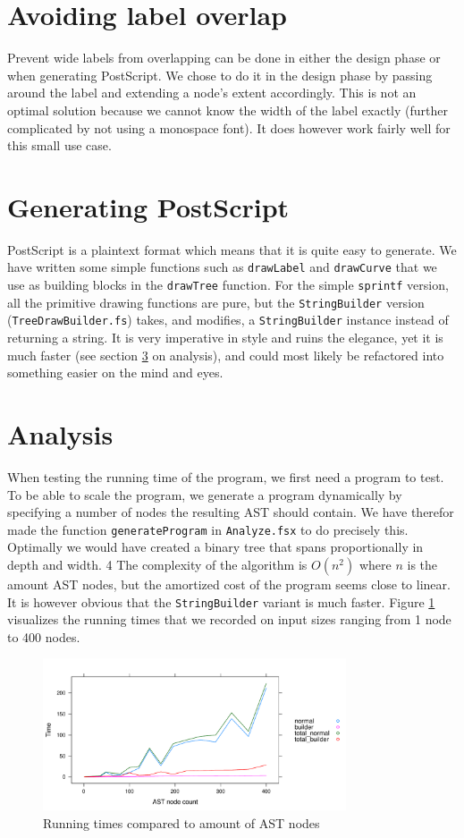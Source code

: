 \documentclass{article}
\begin{document}
\section{Avoiding label overlap}
Prevent wide labels from overlapping can be done in either the design phase or when generating PostScript. We chose to do it in the design phase by passing around the label and extending a node's extent accordingly. This is not an optimal solution because we cannot know the width of the label exactly (further complicated by not using a monospace font). It does however work fairly well for this small use case.


\section{Generating PostScript}
PostScript is a plaintext format which means that it is quite easy to generate. We have written some simple functions such as \texttt{drawLabel} and \texttt{drawCurve} that we use as building blocks in the \texttt{drawTree} function. For the simple \texttt{sprintf} version, all the primitive drawing functions are pure, but the \texttt{StringBuilder} version (\texttt{TreeDrawBuilder.fs}) takes, and modifies, a \texttt{StringBuilder} instance instead of returning a string. It is very imperative in style and ruins the elegance, yet it is much faster (see section \ref{sec:analysis} on analysis), and could most likely be refactored into something easier on the mind and eyes.


\section{Analysis}
\label{sec:analysis}
When testing the running time of the program, we first need a program to test. To be able to scale the program, we generate a program dynamically by specifying a number of nodes the resulting AST should contain. We have therefor made the function {\tt generateProgram} in {\tt Analyze.fsx} to do precisely this. Optimally we would have created a binary tree that spans proportionally in depth and width.
4
The complexity of the algorithm is $O(n^2)$ where $n$ is the amount AST nodes, but the amortized cost of the program seems close to linear. It is however obvious that the \texttt{StringBuilder} variant is much faster. Figure \ref{fig:plot} visualizes the running times that we recorded on input sizes ranging from 1 node to 400 nodes.

\begin{figure}[H]
  \centering
  \includegraphics[width=0.8\textwidth]{../times.pdf}
  \caption{Running times compared to amount of AST nodes}
  \label{fig:plot}
\end{figure}
\end{document}
